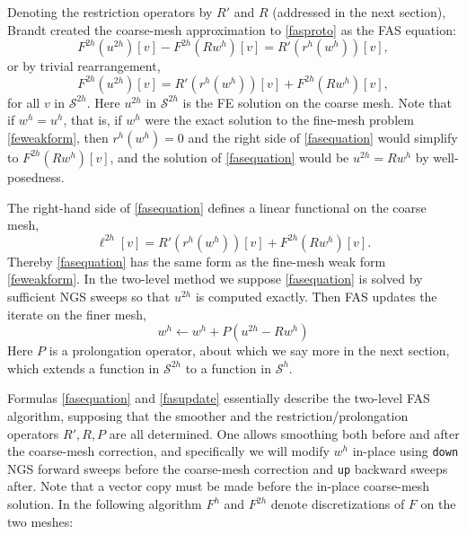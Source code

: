 \documentclass[letterpaper,final,12pt,reqno]{amsart}
\begin{document}
Denoting the restriction operators by $R'$ and $R$ (addressed in the next section), Brandt created the coarse-mesh approximation to \eqref{fasproto} as the FAS equation:
\begin{equation}
  F^{2h}(u^{2h})[v] - F^{2h}(R w^h)[v] = R' (r^h(w^h))[v], \label{faspreequation}
\end{equation}
or by trivial rearrangement,
\begin{equation}
  F^{2h}(u^{2h})[v] = R' (r^h(w^h))[v] + F^{2h}(R w^h)[v], \label{fasequation}
\end{equation}
for all $v$ in $\mathcal{S}^{2h}$.  Here $u^{2h}$ in $\mathcal{S}^{2h}$ is the FE solution on the coarse mesh.  Note that if $w^h=u^h$, that is, if $w^h$ were the exact solution to the fine-mesh problem \eqref{feweakform}, then $r^h(w^h)=0$ and the right side of \eqref{fasequation} would simplify to $F^{2h}(R w^h)[v]$, and the solution of \eqref{fasequation} would be $u^{2h} = R w^h$ by well-posedness.

The right-hand side of \eqref{fasequation} defines a linear functional on the coarse mesh,
\begin{equation}
  \ell^{2h}[v] = R' (r^h(w^h))[v] + F^{2h}(R w^h)[v]. \label{fasell}
\end{equation}
Thereby \eqref{fasequation} has the same form as the fine-mesh weak form \eqref{feweakform}.  In the two-level method we suppose \eqref{fasequation} is solved by sufficient NGS sweeps so that $u^{2h}$ is computed exactly.  Then FAS updates the iterate on the finer mesh,
\begin{equation}
  w^h \gets w^h + P(u^{2h} - R w^h) \label{fasupdate}
\end{equation}
Here $P$ is a prolongation operator, about which we say more in the next section, which extends a function in $\mathcal{S}^{2h}$ to a function in $\mathcal{S}^h$.

Formulas \eqref{fasequation} and \eqref{fasupdate} essentially describe the two-level FAS algorithm, supposing that the smoother and the restriction/prolongation operators $R',R,P$ are all determined.  One allows smoothing both before and after the coarse-mesh correction, and specifically we will modify $w^h$ in-place using \texttt{down} NGS forward sweeps before the coarse-mesh correction and \texttt{up} backward sweeps after.  Note that a vector copy must be made before the in-place coarse-mesh solution.  In the following algorithm $F^h$ and $F^{2h}$ denote discretizations of $F$ on the two meshes:
\end{document}
